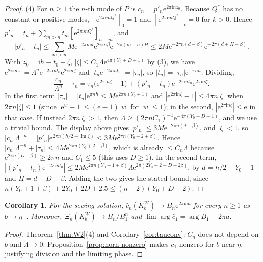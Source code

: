 \documentclass[11pt]{amsart}
\newtheorem{corollary}[theorem]{Corollary}
\theoremstyle{definition}
\newcommand{\Kk}{K}
\newcommand{\eee}{\mathrm{e}}
\newcommand{\ii}{\mathrm{i}}
\begin{document}
\begin{proof}
(4) For $n\ge1$ the $n$-th mode of $P$ is $c_n=p'_n\eee^{2\pi\ii nz_0}$.
Because $Q^*$ has no constant or positive modes,
$[\eee^{2\pi\ii mQ^*}]_0=1$ and $[\eee^{2\pi\ii mQ^*}]_k=0$ for $k>0$.  Hence
$p'_n=t_n+\sum_{m>n}t_m[\eee^{2\pi\ii mQ^*}]_{n-m}$, and
\[
 |p'_n-t_n|\le\sum_{m>n}M\eee^{-2\pi md}\eee^{2\pi m\beta}\eee^{-2\pi(m-n)H}
 \le2M\eee^{-2\pi n(d-\beta)}\eee^{-2\pi(d+H-\beta)} .
\]
With $z_0=\ii h-t_0+\zeta$, $|\zeta|\le C_1\Lambda\eee^{4\pi(Y_0+D+1)}$ by (3), we have
$\eee^{2\pi\ii nz_0}=\Lambda^n\eee^{-2\pi\ii nt_0}\eee^{2\pi\ii n\zeta}$ and
$|t_n\eee^{-2\pi\ii nt_0}|=|\tau_n|$, so
$|t_n|=|\tau_n|\eee^{-\pi nh}$.  Dividing,
\[
 \frac{c_n}{\Lambda^n}-\tau_n=\tau_n\bigl(\eee^{2\pi\ii n\zeta}-1\bigr)
 +(p'_n-t_n)\eee^{-2\pi\ii nt_0}\eee^{2\pi\ii n\zeta}.
\]
In the first term $|\tau_n|=|t_n|\eee^{\pi nh}\le M\eee^{2\pi n(Y_0+1)}$ and
$|\eee^{2\pi\ii n\zeta}-1|\le4\pi n|\zeta|$ when $2\pi n|\zeta|\le1$ (since
$|\eee^w-1|\le(\eee-1)|w|$ for $|w|\le1$); in
the second, $|\eee^{2\pi\ii n\zeta}|\le\eee$ in that case.  If instead
$2\pi n|\zeta|>1$, then
$\Lambda\ge(2\pi nC_1)^{-1}\eee^{-4\pi(Y_0+D+1)}$, and we use a trivial bound.
The display above gives $|p'_n|\le3M\eee^{-2\pi n(d-\beta)}$, and $|\zeta|<1$, so
$|c_n|\Lambda^{-n}=|p'_n|\eee^{2\pi n(h/2-\operatorname{Im}\zeta)}
\le3M\eee^{2\pi n(Y_0+2+\beta)}$.  Hence
$|c_n|\Lambda^{-n}+|\tau_n|\le4M\eee^{2\pi n(Y_0+2+\beta)}$, which is already
$\le C_n\Lambda$ because $\eee^{2\pi n(D-\beta)}\ge2\pi n$ and $C_1\le5$
(this uses $D\ge1$).  In the second term,
$|(p'_n-t_n)\eee^{-2\pi\ii nt_0}|\le2M\eee^{2\pi n(Y_0+1+\beta)}\Lambda
\eee^{2\pi(2Y_0+2+D+2\beta)}$, by $d=h/2-Y_0-1$ and $H=d-D-\beta$.  Adding the two
gives the stated bound, since
$n(Y_0+1+\beta)+2Y_0+2D+2.5\le(n+2)(Y_0+D+2)$.
\end{proof}

\begin{corollary}\label{cor:Kw}
For the sewing solution, $\hat c_n(\Kk^W_b)\to B_n\eee^{2\pi\ii na}$ for every
$n\ge1$ as $b\to\eta^-$.  Moreover,
$\Xi_n(\Kk^W_b)\to B_n/B_1^n$ and
$\lim\arg\hat c_1=\arg B_1+2\pi a$.
\end{corollary}

\begin{proof}
Theorem~\ref{thm:W2}(4) and Corollary~\ref{cor:tauconv}: $C_n$ does not depend
on $b$ and $\Lambda\to0$.  Proposition~\ref{prop:horn-nonzero} makes $c_1$
nonzero for $b$ near $\eta$, justifying division and the limiting phase.
\end{proof}
\end{document}

